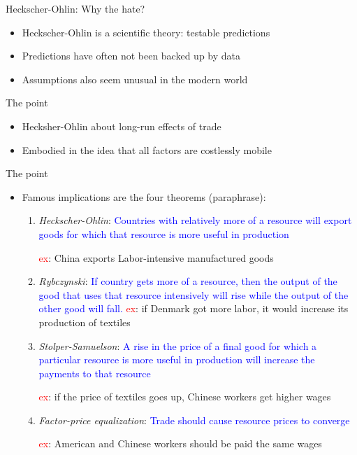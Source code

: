 \documentclass[10pt,hyperref={CJKbookmarks=true},xcolor=dvipsnames,aspectratio=169]{beamer}
\begin{document}
\begin{frame}{Heckscher-Ohlin: Why the hate?}

\begin{itemize}
\item Heckscher-Ohlin is a scientific theory: testable predictions
\item Predictions have often not been backed up by data
\item Assumptions also seem unusual in the modern world
\end{itemize}

\end{frame}

\begin{frame}{The point}

\begin{itemize}
\item Hecksher-Ohlin about long-run effects of trade
\item Embodied in the idea that all factors are costlessly mobile
\end{itemize}

\end{frame}

\begin{frame}{The point}

\begin{itemize}
\item Famous implications are the four theorems (paraphrase):
\begin{enumerate}
\item \emph{Heckscher-Ohlin}: \textcolor{blue}{Countries with relatively more of a resource will export goods for which that resource is more useful in production} 

\textcolor{red}{ex}: China exports Labor-intensive manufactured goods
\item \emph{Rybczynski}: \textcolor{blue}{If country gets more of a resource, then the output of the good that uses that resource intensively will rise while the output of the other good will fall.}
\textcolor{red}{ex}: if Denmark got more labor, it would increase its production of textiles
\item \emph{Stolper-Samuelson}: \textcolor{blue}{A rise in the price of a final good for which a particular resource is more useful in production will increase the payments to that resource}

\textcolor{red}{ex}: if the price of textiles goes up, Chinese workers get higher wages
\item \emph{Factor-price equalization}: \textcolor{blue}{Trade should cause resource prices to converge}

\textcolor{red}{ex}: American and Chinese workers should be paid the same wages
\end{enumerate}
\end{itemize}

\end{frame}
\end{document}
